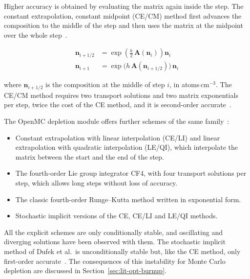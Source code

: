 Higher accuracy is obtained by evaluating the matrix again inside the
step. The constant extrapolation, constant midpoint (CE/CM) method first
advances the composition to the middle of the step and then uses the
matrix at the midpoint over the whole step~\cite{romano_2021_depletion}.

\begin{equation}
\begin{aligned}
\mathbf{n}_{i+1/2} &= \exp\!\left(\tfrac{h}{2}\,\mathbf{A}(\mathbf{n}_i)\right)\mathbf{n}_i \\
\mathbf{n}_{i+1} &= \exp\!\big(h\,\mathbf{A}(\mathbf{n}_{i+1/2})\big)\,\mathbf{n}_i
\end{aligned}
\label{eq:dep-cecm}
\end{equation}

\noindent where $\mathbf{n}_{i+1/2}$ is the composition at the middle of
step $i$, in atoms\,cm$^{-3}$. The CE/CM method requires two transport
solutions and two matrix exponentials per step, twice the cost of the CE
method, and it is second-order accurate~\cite{romano_2021_depletion}.

The OpenMC depletion module offers further schemes of the same
family~\cite{romano_2021_depletion}:

\begin{itemize}
  \item Constant extrapolation with linear interpolation (CE/LI) and
        linear extrapolation with quadratic interpolation (LE/QI), which
        interpolate the matrix between the start and the end of the
        step.

  \item The fourth-order Lie group integrator CF4, with four transport
        solutions per step, which allows long steps without loss of
        accuracy.

  \item The classic fourth-order Runge--Kutta method written in
        exponential form.

  \item Stochastic implicit versions of the CE, CE/LI and LE/QI methods.
\end{itemize}

All the explicit schemes are only conditionally stable, and oscillating
and diverging solutions have been observed with them. The stochastic
implicit method of Dufek et al.\ is unconditionally stable but, like the
CE method, only first-order accurate~\cite{romano_2021_depletion}. The
consequences of this instability for Monte Carlo depletion are discussed
in Section~\ref{sec:lit-opt-burnup}.


